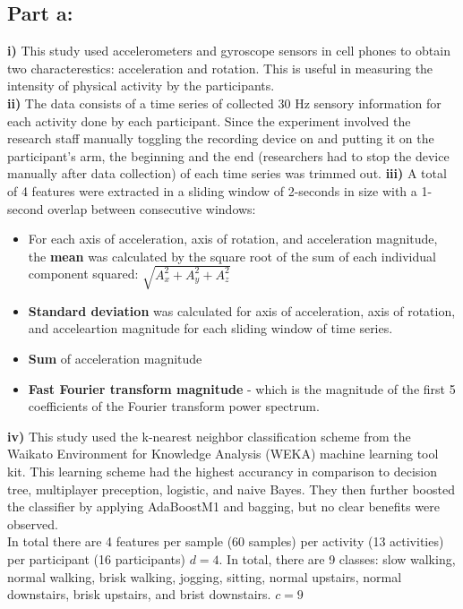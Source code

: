 \documentclass[a4paper,12pt]{article}
\begin{document}
\subsection*{Part a:}

\textbf{i)} This study used accelerometers and gyroscope sensors in cell phones to obtain two characterestics: acceleration and rotation. This is useful in measuring the intensity of physical activity by the participants.\\
\textbf{ii)} The data consists of a time series of collected 30 Hz sensory information for each activity done by each participant. Since the experiment involved the research staff manually toggling the recording device on and putting it on the participant's arm, the beginning and the end (researchers had to stop the device manually after data collection) of each time series was trimmed out.
\textbf{iii)} A total of 4 features were extracted in a sliding window of 2-seconds in size with a 1-second overlap between consecutive windows:
\begin{itemize}
  \item For each axis of acceleration, axis of rotation, and acceleration magnitude, the \textbf{mean} was calculated by the square root of the sum of each individual component squared: $\sqrt{A_x^2 + A_y^2 + A_z^2}$
  \item \textbf{Standard deviation} was calculated for axis of acceleration, axis of rotation, and acceleartion magnitude for each sliding window of time series.
\item \textbf{Sum} of acceleration magnitude
\item \textbf{Fast Fourier transform magnitude} - which is the magnitude of the first 5 coefficients of the Fourier transform power spectrum.
\end{itemize}
\textbf{iv)}
This study used the k-nearest neighbor classification scheme from the Waikato Environment for Knowledge Analysis (WEKA) machine learning tool kit. This learning scheme had the highest accurancy in comparison to decision tree, multiplayer preception, logistic, and naive Bayes. They then further boosted the classifier by applying AdaBoostM1 and bagging, but no clear benefits were observed.\\

In total there are 4 features per sample (60 samples) per activity (13 activities) per participant (16 participants) ${d = 4}$.
In total, there are 9 classes: slow walking, normal walking, brisk walking, jogging, sitting, normal upstairs, normal downstairs, brisk upstairs, and brist downstairs. ${c = 9}$
\end{document}
